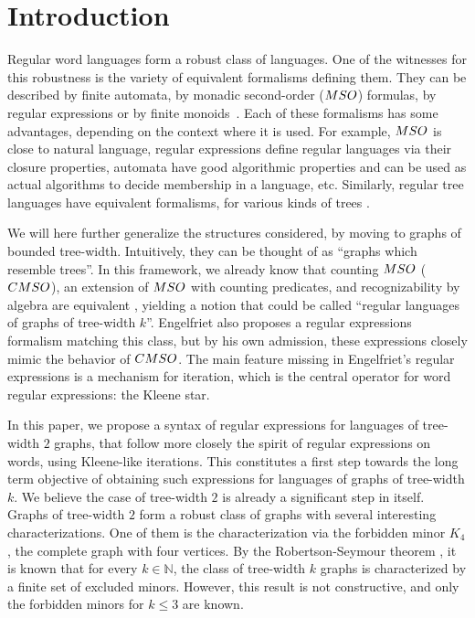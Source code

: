 \section{Introduction}

Regular word languages form a robust class of languages. One of the
witnesses for this robustness is the variety of equivalent formalisms defining them. They can be described by finite automata, by
monadic second-order ($\MSO$) formulas, by regular expressions or by finite
monoids~\cite{Buchi, Elgot, Kleene}. Each of these formalisms has some advantages, depending on the
context where it is used.
For example, $\MSO$ is close to natural language, regular expressions define regular languages via their closure properties, automata
have good algorithmic properties and can be used as actual algorithms to
decide membership in a language, etc. Similarly, regular tree languages have  equivalent formalisms, for various kinds of trees \cite{Kuske, Thatcher, Gcseg}.
\smallskip

We will here further generalize the structures considered, by moving to
graphs of bounded tree-width. Intuitively, they can be thought of as
``graphs which resemble trees''. In this framework, we already know that counting $\MSO$ ($\CMSO$), an extension of $\MSO$ with counting predicates, and recognizability by
algebra are equivalent \cite{BojanczykP16, BojanczykP17}, yielding a notion that
could be called ``regular languages of graphs of tree-width $k$''.
Engelfriet \cite{Engelfriet} also proposes a regular expressions formalism
matching this class, but by his own admission, these expressions closely
mimic the behavior of $\CMSO$. The main feature missing in Engelfriet's regular expressions is a mechanism for iteration, which is the central operator for word regular expressions: the Kleene star.
\smallskip

In this paper, we propose a syntax of regular expressions for languages
of tree-width $2$ graphs, that follow more closely the spirit of regular
expressions on words, using Kleene-like iterations.
This constitutes a first step towards the long term objective of obtaining
such expressions for languages of graphs of tree-width $k$.
We believe the case of tree-width $2$ is already a significant step in itself. Graphs of tree-width $2$ form a robust class of
graphs with several interesting characterizations. One of them
 is the characterization  via the forbidden minor $K_4$, the complete graph with four vertices. By the Robertson-Seymour theorem \cite{Robertson}, it is known
that for every $k\in\mathbb{N}$, the class of tree-width $k$ graphs is
characterized by a finite set of excluded minors.
However, this result is not constructive, and only the  forbidden minors for $k\leq 3$ are known. 
\smallskip

